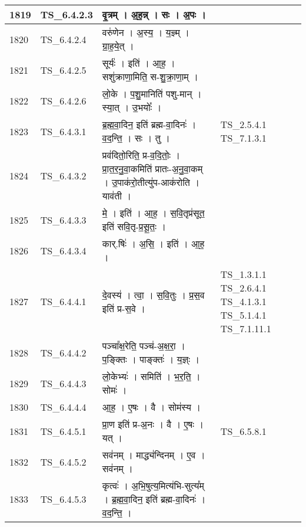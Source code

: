 \documentclass[17pt]{extarticle}
\begin{document}
\begin{longtable}{||p{0.4in}||p{0.9in}||p{4.0in}||p{0.9in}||}
        \hline
            1819 & TS\_6.4.2.3 & वृ॒त्रम्   ।   अ॒ह॒न्न्   ।   सः   ।   अ॒पः   ।    &      \\
        \hline
            1820 & TS\_6.4.2.4 & वरु॑णेन   ।   अ॒स्य॒   ।   य॒ज्ञ्म्   ।   ग्रा॒ह॒ये॒त्   ।    &      \\
        \hline
            1821 & TS\_6.4.2.5 & सूर्यः॑   ।   इति॑   ।   आ॒ह॒   ।   सशु॑क्राणा॒मिति॒ स{-}शु॒क्रा॒णा॒म्   ।    &      \\
        \hline
            1822 & TS\_6.4.2.6 & लो॒के   ।   प॒शु॒मानिति॑ पशु{-}मान्   ।   स्या॒त्   ।   उ॒भयोः᳚   ।    &      \\
        \hline
            1823 & TS\_6.4.3.1 & ब्र॒ह्म॒वा॒दिन॒ इति॑ ब्रह्म{-}वा॒दिनः॑   ।   व॒द॒न्ति॒   ।   सः   ।   तु   ।    & TS\_2.5.4.1  TS\_7.1.3.1       \\
        \hline
            1824 & TS\_6.4.3.2 & प्रव॑दितो॒रिति॒ प्र{-}व॒दि॒तोः॒   ।   प्रा॒त॒र॒नु॒वा॒कमिति॑ प्रातः{-}अ॒नु॒वा॒कम्   ।   उ॒पाक॑रो॒तीत्यु॑प{-}आक॑रोति   ।   याव॑ती   ।    &      \\
        \hline
            1825 & TS\_6.4.3.3 & मे॒   ।   इति॑   ।   आ॒ह॒   ।   स॒वि॒तृप्र॑सूत॒ इति॑ सवि॒तृ{-}प्र॒सू॒तः॒   ।    &      \\
        \hline
            1826 & TS\_6.4.3.4 & कार्.षिः॑   ।   अ॒सि॒   ।   इति॑   ।   आ॒ह॒   ।    &      \\
        \hline
            1827 & TS\_6.4.4.1 & दे॒वस्य॑   ।   त्वा॒   ।   स॒वि॒तुः   ।   प्र॒स॒व इति॑ प्र{-}स॒वे   ।    & TS\_1.3.1.1 TS\_2.6.4.1 TS\_4.1.3.1 TS\_5.1.4.1  TS\_7.1.11.1       \\
        \hline
            1828 & TS\_6.4.4.2 & पञ्चा᳚क्ष॒रेति॒ पञ्च॑{-}अ॒क्ष॒रा॒   ।   प॒ङ्क्तिः   ।   पाङ्क्तः॑   ।   य॒ज्ञ्ः   ।    &      \\
        \hline
            1829 & TS\_6.4.4.3 & लो॒केभ्यः॑   ।   समिति॑   ।   भ॒र॒ति॒   ।   सोमः॑   ।    &      \\
        \hline
            1830 & TS\_6.4.4.4 & आ॒ह॒   ।   ए॒षः   ।   वै   ।   सोम॑स्य   ।    &      \\
        \hline
            1831 & TS\_6.4.5.1 & प्रा॒ण इति॑ प्र{-}अ॒नः   ।   वै   ।   ए॒षः   ।   यत्   ।    &  TS\_6.5.8.1       \\
        \hline
            1832 & TS\_6.4.5.2 & सव॑नम्   ।   माद्ध्य॑न्दिनम्   ।   ए॒व   ।   सव॑नम्   ।    &      \\
        \hline
            1833 & TS\_6.4.5.3 & कृत्वः॑   ।   अ॒भि॒षुत्य॒मित्य॑भि{-}सुत्य᳚म्   ।   ब्र॒ह्म॒वा॒दिन॒ इति॑ ब्रह्म{-}वा॒दिनः॑   ।   व॒द॒न्ति॒   ।    &      \\

\end{longtable}
\end{document}
